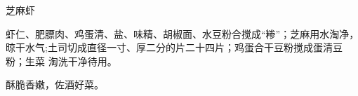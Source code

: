 \begin{recipe}{芝麻虾}

\ingredients


\preparation

\step 虾仁、肥膘肉、鸡蛋清、盐、味精、胡椒面、水豆粉合搅成“糁”；芝麻用水淘净，
晾干水气;土司切成直径一寸、厚二分的片二十四片；鸡蛋合干豆粉搅成蛋清豆粉；生菜
淘洗干净待用。

\features

酥脆香嫩，佐酒好菜。

\end{recipe}

